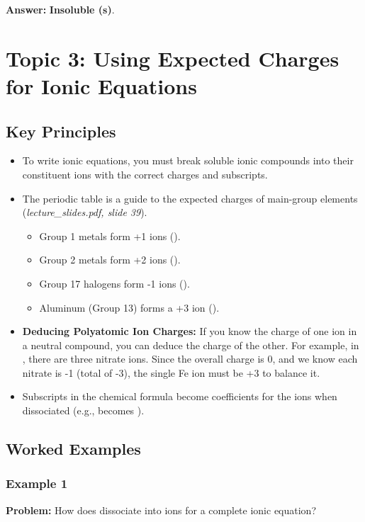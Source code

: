 \documentclass{article}
\begin{document}
\textbf{Answer:} \textbf{Insoluble (s)}.

\section{Topic 3: Using Expected Charges for Ionic Equations}
\subsection{Key Principles}
\begin{itemize}
    \item To write ionic equations, you must break soluble ionic compounds into their constituent ions with the correct charges and subscripts.
    \item The periodic table is a guide to the expected charges of main-group elements (\textit{lecture\_slides.pdf, slide 39}).
        \begin{itemize}
            \item Group 1 metals form +1 ions ().
            \item Group 2 metals form +2 ions ().
            \item Group 17 halogens form -1 ions ().
            \item Aluminum (Group 13) forms a +3 ion ().
        \end{itemize}
    \item \textbf{Deducing Polyatomic Ion Charges:} If you know the charge of one ion in a neutral compound, you can deduce the charge of the other. For example, in , there are three nitrate ions. Since the overall charge is 0, and we know each nitrate is -1 (total of -3), the single Fe ion must be +3 to balance it.
    \item Subscripts in the chemical formula become coefficients for the ions when dissociated (e.g.,  becomes ).
\end{itemize}

\subsection{Worked Examples}
\subsubsection{Example 1}
\textbf{Problem:} How does  dissociate into ions for a complete ionic equation?
\end{document}
